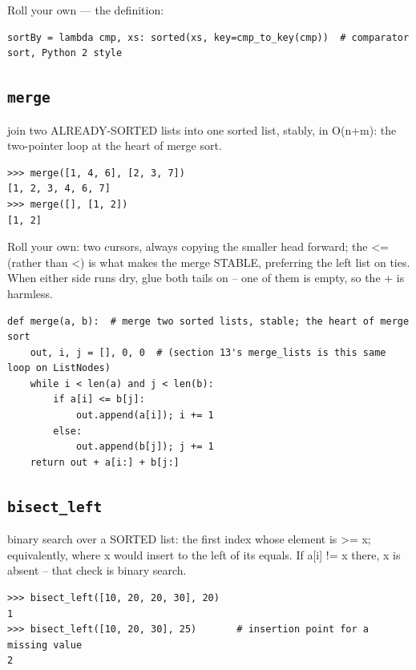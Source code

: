 \documentclass[10pt,letterpaper]{book}
\begin{document}
Roll your own --- the definition:

\begin{lstlisting}[style=ex]
sortBy = lambda cmp, xs: sorted(xs, key=cmp_to_key(cmp))  # comparator sort, Python 2 style
\end{lstlisting}

\subsection{\texttt{merge}}\label{def:merge}
join two ALREADY-SORTED lists into one sorted list, stably, in O(n+m): the two-pointer loop at the heart of merge sort.
\begin{lstlisting}[style=ex]
>>> merge([1, 4, 6], [2, 3, 7])
[1, 2, 3, 4, 6, 7]
>>> merge([], [1, 2])
[1, 2]
\end{lstlisting}

Roll your own: two cursors, always copying the smaller head forward; the <= (rather than <) is what makes the merge STABLE, preferring the left list on ties. When either side runs dry, glue both tails on -- one of them is empty, so the + is harmless.

\begin{lstlisting}[style=ex]
def merge(a, b):  # merge two sorted lists, stable; the heart of merge sort
    out, i, j = [], 0, 0  # (section 13's merge_lists is this same loop on ListNodes)
    while i < len(a) and j < len(b):
        if a[i] <= b[j]:
            out.append(a[i]); i += 1
        else:
            out.append(b[j]); j += 1
    return out + a[i:] + b[j:]
\end{lstlisting}

\subsection{\texttt{bisect\_left}}\label{def:bisect-left}
binary search over a SORTED list: the first index whose element is >= x; equivalently, where x would insert to the left of its equals. If a[i] != x there, x is absent -- that check is binary search.
\begin{lstlisting}[style=ex]
>>> bisect_left([10, 20, 20, 30], 20)
1
>>> bisect_left([10, 20, 30], 25)       # insertion point for a missing value
2
\end{lstlisting}
\end{document}
